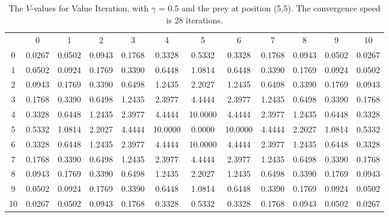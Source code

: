 \documentclass{article}
\begin{document}
\subsection*{}
\begin{table}[htb]
\centering 
 \begin{footnotesize}  
\begin{tabular} {c c c c c c c c c c c c}
 & 0 & 1 & 2 & 3 & 4 & 5 & 6 & 7 & 8 & 9 & 10 \\
 0 & 0.0267 &  0.0502 &  0.0943 &  0.1768 &  0.3328 &  0.5332 &  0.3328 &  0.1768 &  0.0943 &  0.0502 &  0.0267\\
1 & 0.0502 &  0.0924 &  0.1769 &  0.3390 &  0.6448 &  1.0814 &  0.6448 &  0.3390 &  0.1769 &  0.0924 &  0.0502\\
2 & 0.0943 &  0.1769 &  0.3390 &  0.6498 &  1.2435 &  2.2027 &  1.2435 &  0.6498 &  0.3390 &  0.1769 &  0.0943\\
3 & 0.1768 &  0.3390 &  0.6498 &  1.2435 &  2.3977 &  4.4444 &  2.3977 &  1.2435 &  0.6498 &  0.3390 &  0.1768\\
4 & 0.3328 &  0.6448 &  1.2435 &  2.3977 &  4.4444 & 10.0000 &  4.4444 &  2.3977 &  1.2435 &  0.6448 &  0.3328\\
5 & 0.5332 &  1.0814 &  2.2027 &  4.4444 & 10.0000 &  0.0000 & 10.0000 &  4.4444 &  2.2027 &  1.0814 &  0.5332\\
6 & 0.3328 &  0.6448 &  1.2435 &  2.3977 &  4.4444 & 10.0000 &  4.4444 &  2.3977 &  1.2435 &  0.6448 &  0.3328\\
7 & 0.1768 &  0.3390 &  0.6498 &  1.2435 &  2.3977 &  4.4444 &  2.3977 &  1.2435 &  0.6498 &  0.3390 &  0.1768\\
8 & 0.0943 &  0.1769 &  0.3390 &  0.6498 &  1.2435 &  2.2027 &  1.2435 &  0.6498 &  0.3390 &  0.1769 &  0.0943\\
9 & 0.0502 &  0.0924 &  0.1769 &  0.3390 &  0.6448 &  1.0814 &  0.6448 &  0.3390 &  0.1769 &  0.0924 &  0.0502\\
10 & 0.0267 &  0.0502 &  0.0943 &  0.1768 &  0.3328 &  0.5332 &  0.3328 &  0.1768 &  0.0943 &  0.0502 &  0.0267\\
\end{tabular}\\
\end{footnotesize}
\caption{The $V$-values for Value Iteration, with $\gamma$ = 0.5 and the prey at position (5,5). The convergence speed is 28 iterations.}
\label{valueiteration2}
\end{table}
\end{document}
